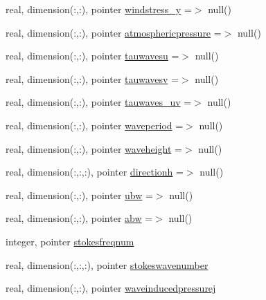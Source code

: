 \begin{DoxyCompactItemize}
\item 
real, dimension(\+:,\+:), pointer \mbox{\hyperlink{structmodulehydrodynamic_1_1t__external_a9670a19197119e8cecda52f493c49d52}{windstress\+\_\+y}} =$>$ null()
\item 
real, dimension(\+:,\+:), pointer \mbox{\hyperlink{structmodulehydrodynamic_1_1t__external_a5ef9e8cad7064155815ee6f8e7b9e303}{atmosphericpressure}} =$>$ null()
\item 
real, dimension(\+:,\+:), pointer \mbox{\hyperlink{structmodulehydrodynamic_1_1t__external_ad38466c837e3d1aa804753a874417224}{tauwavesu}} =$>$ null()
\item 
real, dimension(\+:,\+:), pointer \mbox{\hyperlink{structmodulehydrodynamic_1_1t__external_a62468300fc3a5780f85315217e429fc7}{tauwavesv}} =$>$ null()
\item 
real, dimension(\+:,\+:), pointer \mbox{\hyperlink{structmodulehydrodynamic_1_1t__external_a770a7d6c4ad132871897e0676fac5e66}{tauwaves\+\_\+uv}} =$>$ null()
\item 
real, dimension(\+:,\+:), pointer \mbox{\hyperlink{structmodulehydrodynamic_1_1t__external_a29e5ac70dbbe6bc248bb85b563a6017d}{waveperiod}} =$>$ null()
\item 
real, dimension(\+:,\+:), pointer \mbox{\hyperlink{structmodulehydrodynamic_1_1t__external_a8131086b23ca7d18f5b043a67ed7d7cf}{waveheight}} =$>$ null()
\item 
real, dimension(\+:,\+:,\+:), pointer \mbox{\hyperlink{structmodulehydrodynamic_1_1t__external_abbec03850971c8da0e30d4ec411e1b52}{directionh}} =$>$ null()
\item 
real, dimension(\+:,\+:), pointer \mbox{\hyperlink{structmodulehydrodynamic_1_1t__external_a93a1ad147ba67c1a3b111f289f7a0f12}{ubw}} =$>$ null()
\item 
real, dimension(\+:,\+:), pointer \mbox{\hyperlink{structmodulehydrodynamic_1_1t__external_a5db311714b13c1d999a518ea8f2a26a6}{abw}} =$>$ null()
\item 
integer, pointer \mbox{\hyperlink{structmodulehydrodynamic_1_1t__external_a2f91f5cbb936ceed33656b2ae3fdac24}{stokesfreqnum}}
\item 
real, dimension(\+:,\+:,\+:), pointer \mbox{\hyperlink{structmodulehydrodynamic_1_1t__external_abef239fac212c67b546ee3cd30b8598e}{stokeswavenumber}}
\item 
real, dimension(\+:,\+:), pointer \mbox{\hyperlink{structmodulehydrodynamic_1_1t__external_ac30c3c3adc5cdf832063ae11baaecd10}{waveinducedpressurej}}
\item 

\end{DoxyCompactItemize}
